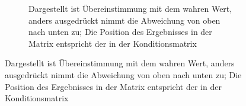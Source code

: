 \begin{figure} [h]
\begin{subfigure}[t]{0.4\textwidth}
                 \caption{ Dargestellt ist Übereinstimmung mit dem wahren Wert, anders ausgedrückt nimmt die Abweichung von oben nach unten zu; Die Position des Ergebnisses in der Matrix entspricht der in der Konditionsmatrix }
                 \label{fig:Results}
         \end{subfigure}
%
\end{figure}
